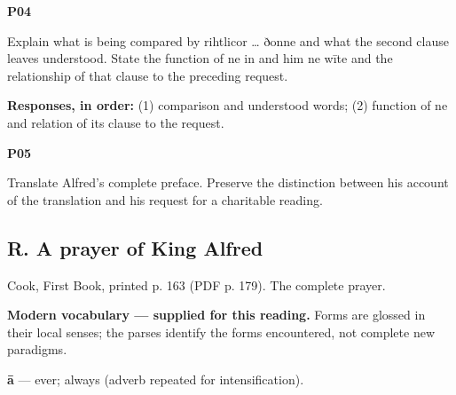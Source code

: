 \par\begin{minipage}{\linewidth}\raggedright
\textbf{P04}

Explain what is being compared by rihtlicor … ðonne and what the second clause leaves understood. State the function of ne in and him ne wīte and the relationship of that clause to the preceding request.

\textbf{Responses, in order:} (1) comparison and understood words; (2) function of ne and relation of its clause to the request.

\end{minipage}\par\addvspace{4pt}

\par\begin{minipage}{\linewidth}\raggedright
\textbf{P05}

Translate Alfred’s complete preface. Preserve the distinction between his account of the translation and his request for a charitable reading.

\end{minipage}\par\addvspace{4pt}

\subsection*{R. A prayer of King Alfred}

Cook, First Book, printed p. 163 (PDF p. 179). The complete prayer.

\textbf{Modern vocabulary — supplied for this reading.} Forms are glossed in their local senses; the parses identify the forms encountered, not complete new paradigms.

\textbf{ā} — ever; always (adverb repeated for intensification).

